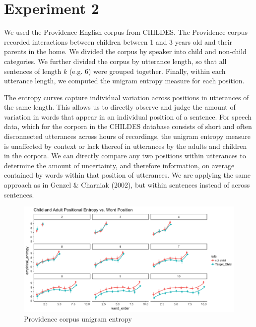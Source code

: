 \documentclass[10pt, letterpaper]{article}
\newenvironment{CodeChunk}{}{}
\begin{document}
\section{Experiment 2}\label{experiment-2}

We used the Providence English corpus from CHILDES. The Providence
corpus recorded interactions between children between 1 and 3 years old
and their parents in the home. We divided the corpus by speaker into
child and non-child categories. We further divided the corpus by
utterance length, so that all sentences of length \(k\) (e.g. \(6\))
were grouped together. Finally, within each utterance length, we
computed the unigram entropy measure for each position.

The entropy curves capture individual variation across positions in
utterances of the same length. This allows us to directly observe and
judge the amount of variation in words that appear in an individual
position of a sentence. For speech data, which for the corpora in the
CHILDES database consists of short and often disconnected utterances
across hours of recordings, the unigram entropy measure is unaffected by
context or lack thereof in utterances by the adults and children in the
corpora. We can directly compare any two positions within utterances to
determine the amount of uncertainty, and therefore information, on
average contained by words within that position of utterances. We are
applying the same approach as in Genzel \& Charniak (2002), but within
sentences instead of across sentences.

\begin{CodeChunk}
\begin{figure}[h]

{\centering \includegraphics{figs/providence_PE-1} 

}

\caption[Providence corpus unigram entropy]{Providence corpus unigram entropy}\label{fig:providence_PE}
\end{figure}
\end{CodeChunk}
\end{document}
